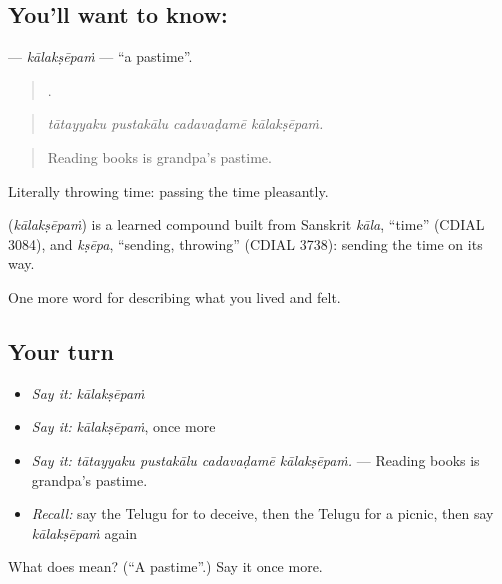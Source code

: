 \subsection*{You'll want to know: }
\textbf{} — \emph{kālakṣēpaṁ} — \textquotedblleft{}a pastime\textquotedblright{}.

\begin{quote}
   .
\end{quote}

\begin{quote}
\emph{tātayyaku pustakālu cadavaḍamē kālakṣēpaṁ.}
\end{quote}

\begin{quote}
Reading books is grandpa's pastime.
\end{quote}

Literally throwing time: passing the time pleasantly.

\begin{cousinweb}
\textbf{} (\emph{kālakṣēpaṁ}) is a learned compound built from Sanskrit \emph{kāla}, \textquotedblleft{}time\textquotedblright{} (CDIAL 3084), and \emph{kṣēpa}, \textquotedblleft{}sending, throwing\textquotedblright{} (CDIAL 3738): sending the time on its way.
\end{cousinweb}

\begin{grammarlens}[title={What you've built}]
One more word for describing what you lived and felt.
\end{grammarlens}

\subsection*{Your turn}
\begin{itemize}
\raggedright
  \item \emph{Say it:} \emph{kālakṣēpaṁ}
  \item \emph{Say it:} \emph{kālakṣēpaṁ}, once more
  \item \emph{Say it:} \emph{tātayyaku pustakālu cadavaḍamē kālakṣēpaṁ.} — Reading books is grandpa's pastime.
  \item \emph{Recall:} say the Telugu for to deceive, then the Telugu for a picnic, then say \emph{kālakṣēpaṁ} again
\end{itemize}

\begin{tcolorbox}[breakable,colback=teal!4,colframe=teal!35!black,title={Before you move on}]
What does  mean? (\textquotedblleft{}A pastime\textquotedblright{}.) Say it once more.
\end{tcolorbox}
